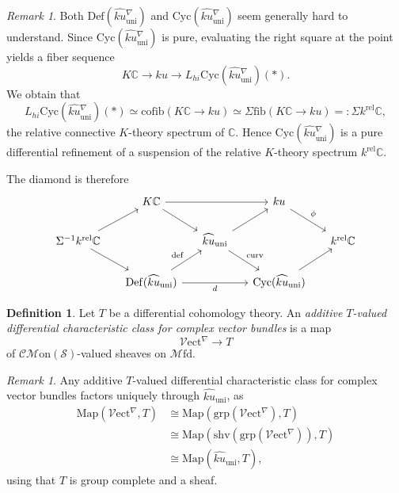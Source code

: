 \documentclass[a4paper]{book}
\newcommand{\lC}{\mathcal{C}}
\newcommand{\bC}{\mathbb{C}}
\newcommand{\lM}{\mathcal{M}}
\newcommand{\lS}{\mathcal{S}}
\newcommand{\lV}{\mathcal{V}}
\newcommand{\Mon}{\lM\mathrm{on}} %
\newcommand{\CMon}{\lC\Mon} %
\newcommand{\Mfd}{\lM\mathrm{fd}} %
\newcommand{\Vect}{\lV\mathrm{ect}} %
\theoremstyle{definition}
\newtheorem{definition}[equation]{Definition}
\theoremstyle{remark}
\newtheorem{remark}[equation]{Remark}
\numberwithin{equation}{section}
\begin{document}
\begin{remark}
Both $\mathrm{Def}(\widehat{ku}{}^\nabla_{\mathrm{uni}})$ and $\mathrm{Cyc}(\widehat{ku}{}^\nabla_{\mathrm{uni}})$ seem generally hard to understand. Since $\mathrm{Cyc}(\widehat{ku}{}^\nabla_{\mathrm{uni}})$ is pure, evaluating the right square at the point yields a fiber sequence
\[
K\bC \longrightarrow ku \longrightarrow L_{hi}\mathrm{Cyc}(\widehat{ku}{}^\nabla_{\mathrm{uni}})(*).
\]
We obtain that
\[
L_{hi}\mathrm{Cyc}(\widehat{ku}{}^\nabla_{\mathrm{uni}})(*) \simeq \mathrm{cofib}(K\bC \to ku) \simeq \Sigma\mathrm{fib}(K\bC \to ku) =: \Sigma k^{\mathrm{rel}}\bC,
\]
the relative connective $K$-theory spectrum of $\bC$. Hence $\mathrm{Cyc}(\widehat{ku}{}^\nabla_{\mathrm{uni}})$ is a pure differential refinement of a suspension of the relative $K$-theory spectrum $ k^{\mathrm{rel}}\bC$. 
\end{remark}

The diamond is therefore
\begin{equation*}
\begin{tikzcd}[column sep=0.5cm]
& 
K\bC 
\ar[dr]\ar[rr]
& & 
ku 
\ar[dr, "\phi"] 
&
\\ 	
\Sigma^{-1} k^{\mathrm{rel}}\bC
\ar[ur]
\ar[dr]
& & 
\widehat{ku}_{\mathrm{uni}}
\ar[ur]
\ar[dr, "\mathrm{curv}"]
& & 
k^{\mathrm{rel}}\bC
\\
& 
\mathrm{Def}(\widehat{ku}{}_{\mathrm{uni}})
\ar[ur, "\mathrm{def}"]
\ar[rr, "d"']
& & 
\mathrm{Cyc}(\widehat{ku}{}_{\mathrm{uni}}) 
\ar[ur]
&
\end{tikzcd}
\end{equation*}



\begin{definition}\cite[Remark 6.6]{bunkenikolausvoelkl2016diffcoh}
Let $T$ be a differential cohomology theory. An \emph{additive $T$-valued differential characteristic class for complex vector bundles} is a map
\[
\Vect^\nabla \longrightarrow T
\]
of $\CMon(\lS)$-valued sheaves on $\Mfd$.
\end{definition}

\begin{remark}
\label{RemarkUniqueFactorization}
Any additive $T$-valued differential characteristic class for complex vector bundles factors uniquely through $\widehat{ku}_{\mathrm{uni}}$, as
\begin{align*}
\mathrm{Map}(\Vect^\nabla,  T)
&\cong 
\mathrm{Map}(\mathrm{grp}(\Vect^\nabla),  T)
\\
&\cong 
\mathrm{Map}(\mathrm{shv}(\mathrm{grp}(\Vect^\nabla)),  T)
\\
&\cong 
\mathrm{Map}(\widehat{ku}{}_{\mathrm{uni}},  T),
\end{align*}
using that $T$ is group complete and a sheaf.
\end{remark}
\end{document}
